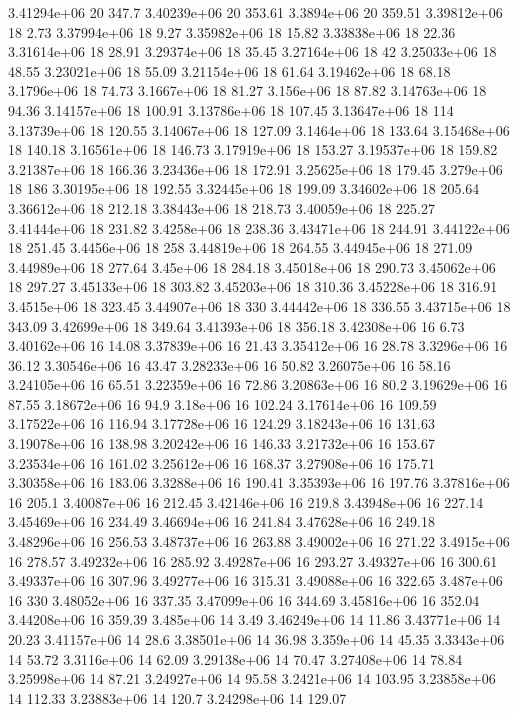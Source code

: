 3.41294e+06 20 347.7
3.40239e+06 20 353.61
3.3894e+06 20 359.51
3.39812e+06 18 2.73
3.37994e+06 18 9.27
3.35982e+06 18 15.82
3.33838e+06 18 22.36
3.31614e+06 18 28.91
3.29374e+06 18 35.45
3.27164e+06 18 42
3.25033e+06 18 48.55
3.23021e+06 18 55.09
3.21154e+06 18 61.64
3.19462e+06 18 68.18
3.1796e+06 18 74.73
3.1667e+06 18 81.27
3.156e+06 18 87.82
3.14763e+06 18 94.36
3.14157e+06 18 100.91
3.13786e+06 18 107.45
3.13647e+06 18 114
3.13739e+06 18 120.55
3.14067e+06 18 127.09
3.1464e+06 18 133.64
3.15468e+06 18 140.18
3.16561e+06 18 146.73
3.17919e+06 18 153.27
3.19537e+06 18 159.82
3.21387e+06 18 166.36
3.23436e+06 18 172.91
3.25625e+06 18 179.45
3.279e+06 18 186
3.30195e+06 18 192.55
3.32445e+06 18 199.09
3.34602e+06 18 205.64
3.36612e+06 18 212.18
3.38443e+06 18 218.73
3.40059e+06 18 225.27
3.41444e+06 18 231.82
3.4258e+06 18 238.36
3.43471e+06 18 244.91
3.44122e+06 18 251.45
3.4456e+06 18 258
3.44819e+06 18 264.55
3.44945e+06 18 271.09
3.44989e+06 18 277.64
3.45e+06 18 284.18
3.45018e+06 18 290.73
3.45062e+06 18 297.27
3.45133e+06 18 303.82
3.45203e+06 18 310.36
3.45228e+06 18 316.91
3.4515e+06 18 323.45
3.44907e+06 18 330
3.44442e+06 18 336.55
3.43715e+06 18 343.09
3.42699e+06 18 349.64
3.41393e+06 18 356.18
3.42308e+06 16 6.73
3.40162e+06 16 14.08
3.37839e+06 16 21.43
3.35412e+06 16 28.78
3.3296e+06 16 36.12
3.30546e+06 16 43.47
3.28233e+06 16 50.82
3.26075e+06 16 58.16
3.24105e+06 16 65.51
3.22359e+06 16 72.86
3.20863e+06 16 80.2
3.19629e+06 16 87.55
3.18672e+06 16 94.9
3.18e+06 16 102.24
3.17614e+06 16 109.59
3.17522e+06 16 116.94
3.17728e+06 16 124.29
3.18243e+06 16 131.63
3.19078e+06 16 138.98
3.20242e+06 16 146.33
3.21732e+06 16 153.67
3.23534e+06 16 161.02
3.25612e+06 16 168.37
3.27908e+06 16 175.71
3.30358e+06 16 183.06
3.3288e+06 16 190.41
3.35393e+06 16 197.76
3.37816e+06 16 205.1
3.40087e+06 16 212.45
3.42146e+06 16 219.8
3.43948e+06 16 227.14
3.45469e+06 16 234.49
3.46694e+06 16 241.84
3.47628e+06 16 249.18
3.48296e+06 16 256.53
3.48737e+06 16 263.88
3.49002e+06 16 271.22
3.4915e+06 16 278.57
3.49232e+06 16 285.92
3.49287e+06 16 293.27
3.49327e+06 16 300.61
3.49337e+06 16 307.96
3.49277e+06 16 315.31
3.49088e+06 16 322.65
3.487e+06 16 330
3.48052e+06 16 337.35
3.47099e+06 16 344.69
3.45816e+06 16 352.04
3.44208e+06 16 359.39
3.485e+06 14 3.49
3.46249e+06 14 11.86
3.43771e+06 14 20.23
3.41157e+06 14 28.6
3.38501e+06 14 36.98
3.359e+06 14 45.35
3.3343e+06 14 53.72
3.3116e+06 14 62.09
3.29138e+06 14 70.47
3.27408e+06 14 78.84
3.25998e+06 14 87.21
3.24927e+06 14 95.58
3.2421e+06 14 103.95
3.23858e+06 14 112.33
3.23883e+06 14 120.7
3.24298e+06 14 129.07
